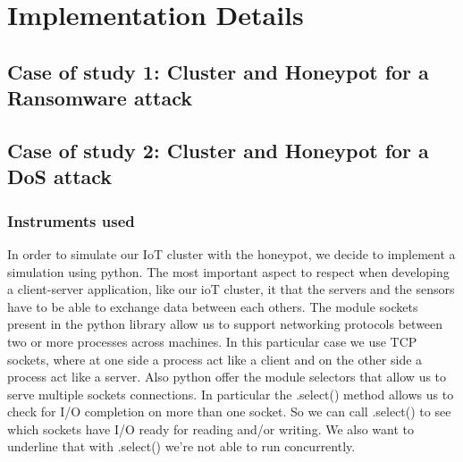 \chapter{Implementation Details}
\section{Case of study 1: Cluster and Honeypot for a Ransomware attack}
\section{Case of study 2: Cluster and Honeypot for a DoS attack}
\subsection{Instruments used}
In order to simulate our IoT cluster with the honeypot, we decide to implement a simulation using python. The most important aspect 
to respect when developing a client-server application, like our ioT cluster, it that the servers and the sensors have to be able to exchange data 
between each others. The module sockets present in  the python library allow us to support networking protocols between two or more processes across machines. In this particular case we use TCP sockets, where at one side a process act like a client and on the other side a process act like a server. Also python offer the module selectors that allow us to serve multiple sockets connections. In particular the .select() method allows us to check for I/O completion on more than one socket. So we can call .select() to see which sockets have I/O ready for reading and/or writing.  We also want to underline that with .select()  we’re not able to run concurrently. 

